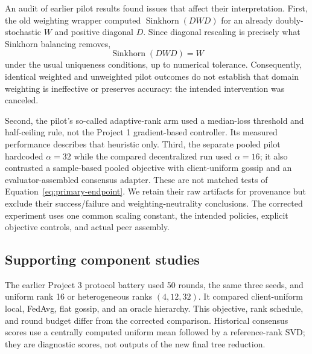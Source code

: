\documentclass[11pt]{article}
\begin{document}
An audit of earlier pilot results found issues that affect their interpretation. First, the old weighting wrapper computed $\operatorname{Sinkhorn}(DWD)$ for an already doubly-stochastic $W$ and positive diagonal $D$. Since diagonal rescaling is precisely what Sinkhorn balancing removes,
\begin{equation}
 \operatorname{Sinkhorn}(DWD)=W
\end{equation}
under the usual uniqueness conditions, up to numerical tolerance. Consequently, identical weighted and unweighted pilot outcomes do not establish that domain weighting is ineffective or preserves accuracy: the intended intervention was canceled.

Second, the pilot's so-called adaptive-rank arm used a median-loss threshold and half-ceiling rule, not the Project 1 gradient-based controller. Its measured performance describes that heuristic only. Third, the separate pooled pilot hardcoded $\alpha=32$ while the compared decentralized run used $\alpha=16$; it also contrasted a sample-based pooled objective with client-uniform gossip and an evaluator-assembled consensus adapter. These are not matched tests of Equation~\eqref{eq:primary-endpoint}. We retain their raw artifacts for provenance but exclude their success/failure and weighting-neutrality conclusions. The corrected experiment uses one common scaling constant, the intended policies, explicit objective controls, and actual peer assembly.

\subsection{Supporting component studies}
The earlier Project 3 protocol battery used 50 rounds, the same three seeds, and uniform rank 16 or heterogeneous ranks $(4,12,32)$. It compared client-uniform local, FedAvg, flat gossip, and an oracle hierarchy. This objective, rank schedule, and round budget differ from the corrected comparison. Historical consensus scores use a centrally computed uniform mean followed by a reference-rank SVD; they are diagnostic scores, not outputs of the new final tree reduction.
\end{document}
